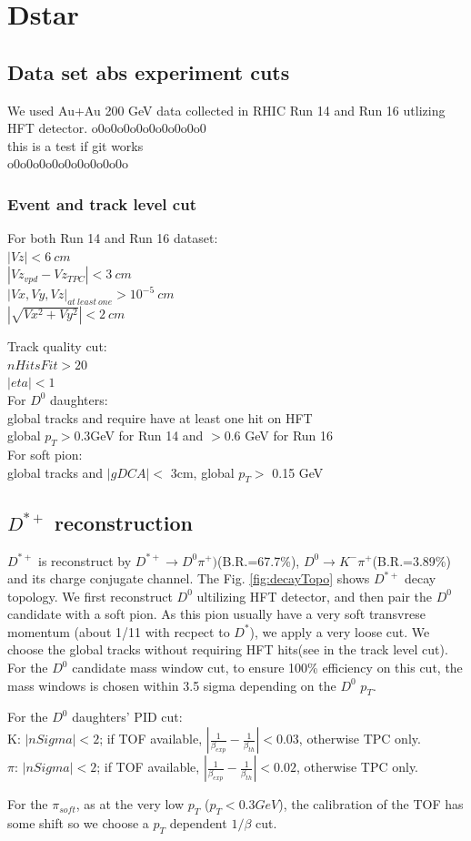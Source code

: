\clearpage

\section{Dstar}
\subsection{Data set abs experiment cuts}
We used Au+Au 200 GeV data collected in RHIC Run 14 and Run 16 utlizing HFT detector. 
o0o0o0o0o0o0o0o0o0\\
this is a test if git works \\
o0o0o0o0o0o0o0o0o0o\\
\subsubsection{Event and track level cut}
For both Run 14 and Run 16 dataset: \\
$|Vz|<6~cm$ \\
$|Vz_{vpd}-Vz_{TPC}|< 3~cm$ \\
$|Vx,Vy,Vz|_{at~least~one}> 10^{-5}~cm$\\
$|\sqrt{Vx^{2}+Vy^{2}}|< 2~cm$ 
\par
Track quality cut:\\
$nHitsFit > 20$\\
$|eta|<1$\\
For $D^{0}$ daughters:\\
 global tracks and require have at least one hit on HFT\\
 global $p_{T}>$0.3GeV for Run 14 and $>$0.6 GeV for Run 16\\
For soft pion:\\
 global tracks and $|gDCA|<$  3cm, global $p_{T}>$ 0.15 GeV
\subsection{$D^{*+}$ reconstruction}
	$D^{*+}$ is reconstruct by $D^{*+}\rightarrow D^{0}\pi^{+})$(B.R.=67.7\%), $D^{0}\rightarrow K^{-}\pi^{+}$(B.R.=3.89\%) and its charge conjugate channel. The Fig. \ref{fig:decayTopo} shows $D^{*+}$ decay topology. We first reconstruct $D^{0}$ ultilizing HFT detector, and then pair the $D^{0}$ candidate with a soft pion. As this pion usually have a very soft transvrese momentum (about 1/11 with recpect to $D^{*}$), we apply a very loose cut. We choose the global tracks without requiring HFT hits(see in the track level cut). For the $D^{0}$ candidate mass window cut, to ensure 100\% efficiency on this cut, the mass windows is chosen within 3.5 sigma depending on the $D^{0}$ $p_{T}$.  
	\par
	For the $D^{0}$ daughters' PID cut:\\
	K: $|nSigma|<2$; if TOF available, $|\frac{1}{\beta_{exp}}-\frac{1}{\beta_{th}}|<0.03$, otherwise TPC only.
\\
	$\pi$: $|nSigma|<2$; if TOF available, $|\frac{1}{\beta_{exp}}-\frac{1}{\beta_{th}}|<0.02$, otherwise TPC only.
	\par
	For the $\pi_{soft}$, as at the very low $p_{T}$ ($p_{T}<0.3 GeV$), the calibration of the TOF has some shift so we choose a $p_{T}$ dependent $1/\beta$ cut.
	
